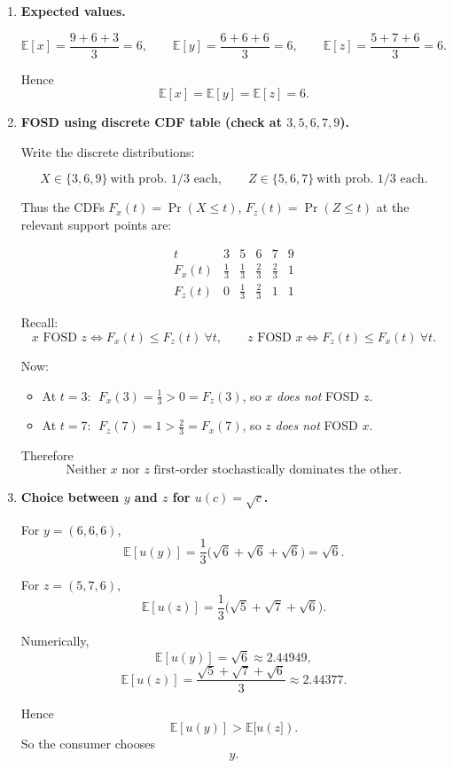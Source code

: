 \documentclass[12pt]{article}
\begin{document}
\begin{enumerate}[label=(\alph*)]
\item \textbf{Expected values.}

\[
\mathbb E[x]=\frac{9+6+3}{3}=6,\qquad
\mathbb E[y]=\frac{6+6+6}{3}=6,\qquad
\mathbb E[z]=\frac{5+7+6}{3}=6.
\]

Hence
\[
\boxed{\mathbb E[x]=\mathbb E[y]=\mathbb E[z]=6.}
\]

\item \textbf{FOSD using discrete CDF table (check at \(3,5,6,7,9\)).}

Write the discrete distributions:

\[
X\in\{3,6,9\}\ \text{with prob. }1/3\text{ each},\qquad
Z\in\{5,6,7\}\ \text{with prob. }1/3\text{ each}.
\]

Thus the CDFs \(F_x(t)=\Pr(X\le t)\), \(F_z(t)=\Pr(Z\le t)\) at the relevant support points are:

\[
\begin{array}{c|ccccc}
t & 3 & 5 & 6 & 7 & 9\\ \hline
F_x(t) & \frac13 & \frac13 & \frac23 & \frac23 & 1\\
F_z(t) & 0 & \frac13 & \frac23 & 1 & 1
\end{array}
\]

Recall:
\[
x \text{ FOSD } z \iff F_x(t)\le F_z(t)\ \forall t,
\qquad
z \text{ FOSD } x \iff F_z(t)\le F_x(t)\ \forall t.
\]

Now:
\begin{itemize}
\item At \(t=3\): \(\;F_x(3)=\frac13 > 0 = F_z(3)\), so \(x\) \emph{does not} FOSD \(z\).
\item At \(t=7\): \(\;F_z(7)=1 > \frac23 = F_x(7)\), so \(z\) \emph{does not} FOSD \(x\).
\end{itemize}

Therefore
\[
\boxed{\text{Neither }x\text{ nor }z\text{ first-order stochastically dominates the other.}}
\]

\item \textbf{Choice between \(y\) and \(z\) for \(u(c)=\sqrt c\).}

For \(y=(6,6,6)\),
\[
\mathbb E[u(y)]
=\frac{1}{3}\big(\sqrt6+\sqrt6+\sqrt6\big)
=\sqrt6.
\]

For \(z=(5,7,6)\),
\[
\mathbb E[u(z)]
=\frac{1}{3}\big(\sqrt5+\sqrt7+\sqrt6\big).
\]

Numerically,
\[
\mathbb E[u(y)] = \sqrt6 \approx 2.44949,
\]
\[
\mathbb E[u(z)] = \frac{\sqrt5+\sqrt7+\sqrt6}{3} \approx 2.44377.
\]

Hence
\[
\mathbb E[u(y)]>\mathbb E[u(z]).
\]
So the consumer chooses
\[
\boxed{y.}
\]
\end{enumerate}
\end{document}
